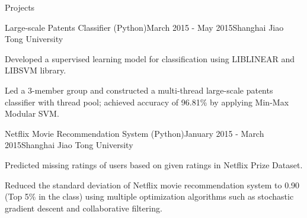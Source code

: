 \documentclass{resume} %
\begin{document}
\begin{rSection}{Projects}
\begin{rSubsection}{Large-scale Patents Classifier (Python)}{March 2015 - May 2015}{}{Shanghai Jiao Tong University}
\item Developed a supervised learning model for classification using LIBLINEAR and LIBSVM library.
\item Led a 3-member group and constructed a multi-thread large-scale patents classifier with thread pool; achieved accuracy of 96.81\% by applying Min-Max Modular SVM.
\end{rSubsection}

\begin{rSubsection}{Netflix Movie Recommendation System (Python)}{January 2015 - March 2015}{}{Shanghai Jiao Tong University}
\item Predicted missing ratings of users based on given ratings in Netflix Prize Dataset.
\item Reduced the standard deviation of Netflix movie recommendation system to 0.90 (Top 5\% in the class) using multiple optimization algorithms such as stochastic gradient descent and collaborative filtering.
\end{rSubsection}


\end{rSection}


\end{document}
